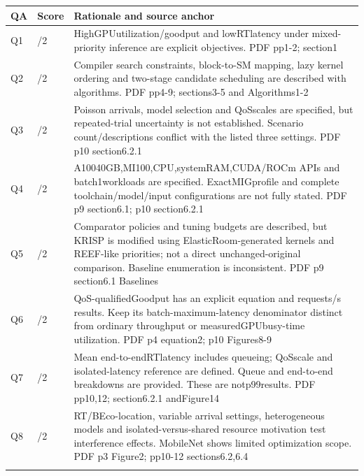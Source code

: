 \begin{longtable}{>{\raggedright\arraybackslash}p{}>{\raggedright\arraybackslash}p{}>{\raggedright\arraybackslash}p{}}
\toprule
\textbf{QA} & \textbf{Score} & \textbf{Rationale and source anchor}\\\midrule\endhead
Q1 & 2/2 & HighGPUutilization/goodput and lowRTlatency under mixed-priority inference are explicit objectives. PDF pp1-2;\allowbreak{} section1\\\addlinespace
Q2 & 2/2 & Compiler search constraints,\allowbreak{} block-to-SM mapping,\allowbreak{} lazy kernel ordering and two-stage candidate scheduling are described with algorithms. PDF pp4-9;\allowbreak{} sections3-5 and Algorithms1-2\\\addlinespace
Q3 & 1/2 & Poisson arrivals,\allowbreak{} model selection and QoSscales are specified,\allowbreak{} but repeated-trial uncertainty is not established. Scenario count/descriptions conflict with the listed three settings. PDF p10 section6.2.1\\\addlinespace
Q4 & 1/2 & A10040GB,\allowbreak{}MI100,\allowbreak{}CPU,\allowbreak{}systemRAM,\allowbreak{}CUDA/ROCm APIs and batch1workloads are specified. ExactMIGprofile and complete toolchain/model/input configurations are not fully stated. PDF p9 section6.1;\allowbreak{} p10 section6.2.1\\\addlinespace
Q5 & 1/2 & Comparator policies and tuning budgets are described,\allowbreak{} but KRISP is modified using ElasticRoom-generated kernels and REEF-like priorities;\allowbreak{} not a direct unchanged-original comparison. Baseline enumeration is inconsistent. PDF p9 section6.1 Baselines\\\addlinespace
Q6 & 2/2 & QoS-qualifiedGoodput has an explicit equation and requests/s results. Keep its batch-maximum-latency denominator distinct from ordinary throughput or measuredGPUbusy-time utilization. PDF p4 equation2;\allowbreak{} p10 Figures8-9\\\addlinespace
Q7 & 2/2 & Mean end-to-endRTlatency includes queueing;\allowbreak{} QoSscale and isolated-latency reference are defined. Queue and end-to-end breakdowns are provided. These are notp99results. PDF pp10,\allowbreak{}12;\allowbreak{} section6.2.1 andFigure14\\\addlinespace
Q8 & 2/2 & RT/BEco-location,\allowbreak{} variable arrival settings,\allowbreak{} heterogeneous models and isolated-versus-shared resource motivation test interference effects. MobileNet shows limited optimization scope. PDF p3 Figure2;\allowbreak{} pp10-12 sections6.2,\allowbreak{}6.4\\\addlinespace

\end{longtable}
